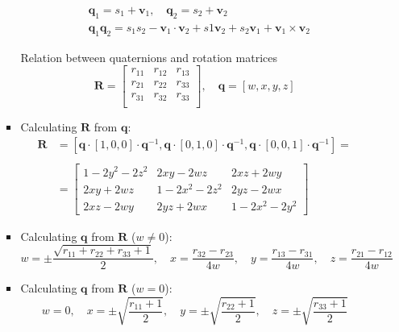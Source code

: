 \documentclass[10pt, aspectratio=169]{beamer}
\theoremstyle{remark}
\theoremstyle{definition}
\begin{document}
\begin{frame}[allowframebreaks]
\begin{enumerate}
\begin{itemize}
\begin{itemize}
            \begin{equation*}
                \begin{split}
                    & \mathbf{q}_1 = s_1 + \mathbf{v}_1, \quad \mathbf{q}_2 = s_2 + \mathbf{v}_2\\
                    & \mathbf{q}_1 \mathbf{q}_2 = s_1s_2 - \mathbf{v}_1 \cdot \mathbf{v}_2 + s1\mathbf{v}_2 + s_2\mathbf{v}_1 + \mathbf{v}_1 \times \mathbf{v}_2
                \end{split}
            \end{equation*}

            \framebreak

            Relation between quaternions and rotation matrices~\cite{3D_rotation_converter, rotation_calculator}
            $$
            \mathbf{R} = \begin{bmatrix}
                r_{11} & r_{12} & r_{13}\\
                r_{21} & r_{22} & r_{33}\\
                r_{31} & r_{32} & r_{33}\\
            \end{bmatrix} , \quad
            \mathbf{q} = [w, x, y, z]
            $$
            
                \item Calculating $\mathbf{R}$ from $\mathbf{q}$:
                \begin{equation*}
                    \begin{split}
                        \mathbf{R} & = \left[ \mathbf{q} \cdot [1,0,0] \cdot \mathbf{q}^{-1} , \mathbf{q} \cdot [0,1,0] \cdot \mathbf{q}^{-1}, \mathbf{q} \cdot [0,0,1] \cdot \mathbf{q}^{-1}     \right] = \\ \\
                    & = \begin{bmatrix}
                    1 - 2y^2 - 2z^2 & 2xy - 2wz & 2xz + 2wy \\
                    2xy + 2wz & 1 - 2x^2 - 2z^2 & 2yz - 2wx \\
                    2xz - 2wy & 2yz + 2wx & 1 - 2x^2 - 2y^2
                    \end{bmatrix}
                    \end{split}
                \end{equation*}
                \framebreak
                \item Calculating $\mathbf{q}$ from $\mathbf{R}$ ($w\neq 0$): 
                $$
                w = \pm \frac{\sqrt{r_{11} + r_{22} + r_{33} + 1}}{2}, \quad
                x = \frac{r_{32} - r_{23}}{4w}, \quad y = \frac{r_{13} - r_{31}}{4w}, \quad z = \frac{r_{21} - r_{12}}{4w}
                $$ 
                \item Calculating $\mathbf{q}$ from $\mathbf{R}$ ($w= 0$): 
                $$
                w = 0, \quad 
                x = \pm \sqrt{\frac{r_{11} + 1}{2}}, \quad
                y = \pm \sqrt{\frac{r_{22} + 1}{2}}, \quad
                z = \pm \sqrt{\frac{r_{33} + 1}{2}}
                $$
        \end{itemize}


\end{itemize}
\end{enumerate}
\end{frame}
\end{document}
